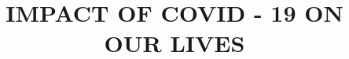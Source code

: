 \documentclass[a4paper, 12pt]{article}
\begin{document}
\title{\Large\textbf{IMPACT OF COVID - 19 ON OUR LIVES}}
\author{\small\textit{}}
\date{}
\maketitle
\newpage

\tableofcontents
\newpage
\end{document}
